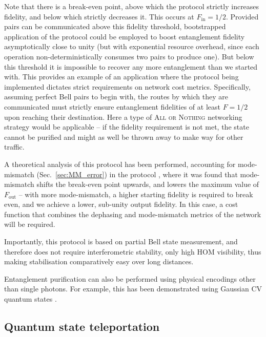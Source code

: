 Note that there is a break-even point, above which the protocol strictly increases fidelity, and below which strictly decreases it. This occurs at \mbox{$F_\mathrm{in}=1/2$}. Provided pairs can be communicated above this fidelity threshold, bootstrapped application of the protocol could be employed to boost entanglement fidelity asymptotically close to unity (but with exponential resource overhead, since each operation non-deterministically consumes two pairs to produce one). But below this threshold it is impossible to recover any more entanglement than we started with. This provides an example of an application where the protocol being implemented dictates strict requirements on network cost metrics. Specifically, assuming perfect Bell pairs to begin with, the routes by which they are communicated must strictly ensure entanglement fidelities of at least \mbox{$F=1/2$} upon reaching their destination. Here a type of \textsc{All or Nothing} networking strategy would be applicable -- if the fidelity requirement is not met, the state cannot be purified and might as well be thrown away to make way for other traffic.

A theoretical analysis of this protocol has been performed, accounting for mode-mismatch (Sec.~\ref{sec:MM_error}) in the protocol \cite{bib:RohdeOptEntPur06}, where it was found that mode-mismatch shifts the break-even point upwards, and lowers the maximum value of $F_\mathrm{out}$ -- with more mode-mismatch, a higher starting fidelity is required to break even, and we achieve a lower, sub-unity output fidelity. In this case, a cost function that combines the dephasing and mode-mismatch metrics of the network will be required.

Importantly, this protocol is based on partial Bell state measurement, and therefore does not require interferometric stability, only high HOM visibility, thus making stabilisation comparatively easy over long distances.

Entanglement purification can also be performed using physical encodings other than single photons. For example, this has been demonstrated using Gaussian CV quantum states \cite{bib:Duan00}.

%
%

\subsection{Quantum state teleportation} \label{sec:teleport} 

